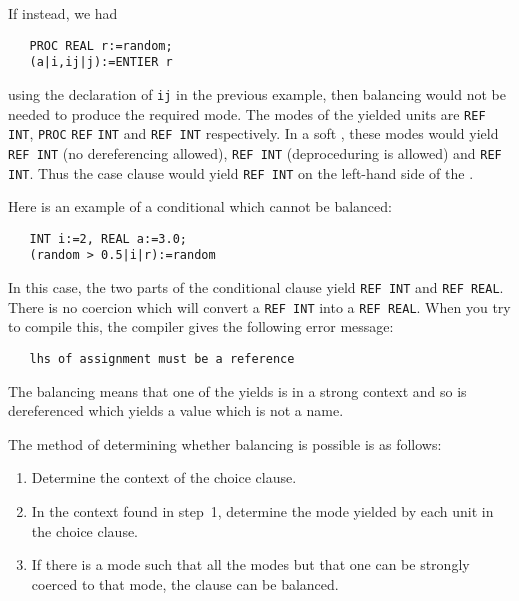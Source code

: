 If instead, we had
\begin{verbatim}
   PROC REAL r:=random;
   (a|i,ij|j):=ENTIER r
\end{verbatim}
\noindent
using the declaration of \verb|ij| in the previous example, then
balancing would not be needed to produce the required mode.  The
modes of the yielded units are \verb|REF INT|, \verb|PROC| \verb|REF|
\verb|INT| and \verb|REF INT| respectively.  In a soft
, these modes would yield \verb|REF INT|
(no dereferencing allowed), \verb|REF INT| (deproceduring is allowed)
and \verb|REF INT|.  Thus the case clause would yield \verb|REF INT|
on the left-hand side of the .

Here is an example of a conditional 
which cannot be balanced:
\begin{verbatim}
   INT i:=2, REAL a:=3.0;
   (random > 0.5|i|r):=random
\end{verbatim}
\noindent
In this case, the two parts of the conditional clause yield
\verb|REF INT| and \verb|REF REAL|. There is no coercion which will
convert a \verb|REF INT| into a \verb|REF REAL|. When you try to
compile this, the  compiler gives the
following error message:
\begin{verbatim}
   lhs of assignment must be a reference
\end{verbatim}
\noindent
The balancing means that one of the yields is in a strong context and
so is dereferenced which yields a value which is not a name.

The method of determining whether balancing is possible is as follows:
\begin{enumerate}
\item Determine the context of the choice clause.
\item In the context found in step~1, determine the mode yielded by
each unit in the choice clause.
\item If there is a mode such that all the modes but that one can be
strongly coerced to that mode, the clause can be balanced.
\end{enumerate}

